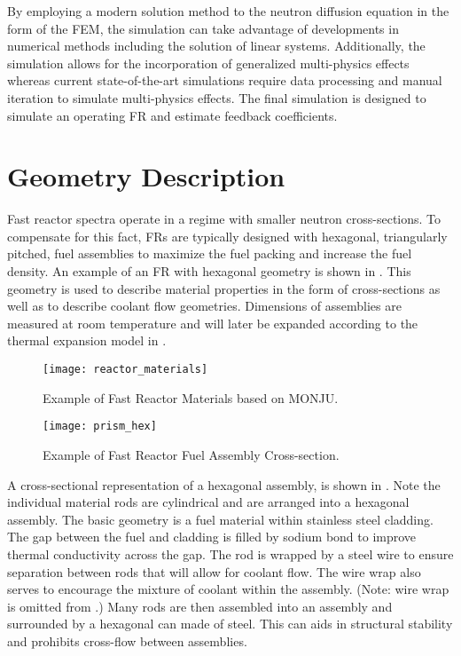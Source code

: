   By employing a modern solution method to the neutron diffusion
  equation in the form of the FEM, the simulation can take advantage of 
  developments in numerical methods including the solution of linear systems. 
  Additionally, the simulation allows for the incorporation of generalized 
  multi-physics effects whereas current state-of-the-art simulations require 
  data processing and manual iteration to simulate multi-physics effects. The 
  final simulation is designed to simulate an operating FR and estimate 
  feedback coefficients.

\section{Geometry Description}
  \label{sec:geometry_description}
  Fast reactor spectra operate in a regime with smaller neutron cross-sections.
  To compensate for this fact, FRs are typically designed with hexagonal,
  triangularly pitched, fuel assemblies to maximize the fuel packing and
  increase the fuel density. An example of an FR with hexagonal geometry
  is shown in .
  This geometry is used to describe material properties in the form of 
  cross-sections as well as to describe coolant flow geometries. Dimensions of 
  assemblies are measured at room temperature and will later be expanded 
  according to the thermal expansion model in .
  
  \begin{figure}
    \centering
    \texttt{[image: reactor\_materials]}
    \caption{Example of Fast Reactor Materials based on MONJU.}
    \label{fig:reactor_materials}
  \end{figure}

  \begin{figure}
    \centering
    \texttt{[image: prism\_hex]}
    \caption{Example of Fast Reactor Fuel Assembly Cross-section.}
    \label{fig:prism_hex}
  \end{figure}

  A cross-sectional representation of a hexagonal assembly, is shown in 
  . 
  Note the individual material rods are cylindrical and are arranged
  into a hexagonal assembly. The basic geometry is a fuel material within
  stainless steel cladding. The gap between the fuel and cladding is filled by
  sodium bond to improve thermal conductivity across the gap. The rod is
  wrapped by a steel wire to ensure separation between rods that will allow for
  coolant flow. The wire wrap also serves to encourage the mixture of coolant
  within the assembly. (Note: wire wrap is omitted from .) 
  Many rods are then assembled into an assembly and surrounded by a hexagonal 
  can made of steel. This can aids in structural stability and prohibits 
  cross-flow between assemblies. 

